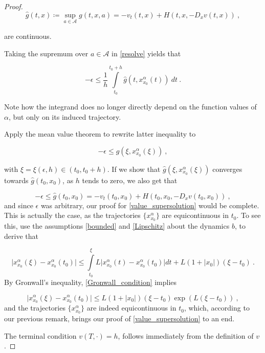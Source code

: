 \begin{theorem}
\begin{proof}
		\begin{equation*}
			\hat{g}(t, x) \coloneqq \sup\limits_{a \in \mathcal{A}} g(t, x, a) = -v_t(t, x) + H(t, x, -D_x v(t, x)) \ ,
		\end{equation*}
		
		are continuous.
		
		Taking the supremum over $ a \in \mathcal{A} $ in \eqref{resolve} yields that
		
		\begin{equation*}
			- \epsilon \leq \frac{1}{h} \int\limits^{t_0 + h}_{t_0} \hat{g}(t, x^{\alpha}_{x_0}(t)) \ dt \ .
		\end{equation*}
		
		Note how the integrand does no longer directly depend on the function values of $ \alpha $, but only on its induced trajectory.
		
		Apply the mean value theorem to rewrite latter inequality to
		
		\begin{equation*}
			- \epsilon \leq \hat{g}(\xi, x^{\alpha}_{x_0}(\xi)) \ ,
		\end{equation*}
		
		with $ \xi = \xi(\epsilon, h) \in \left( t_0, t_0 + h \right) $. If we show that $ \hat{g}(\xi, x^{\alpha}_{x_0}(\xi)) $ converges towards $ \hat{g}(t_0, x_0) $, as $ h $ tends to zero, we also get that
		
		\begin{equation*}
			-\epsilon \leq \hat{g}(t_0, x_0) = -v_t(t_0, x_0) + H(t_0, x_0, -D_x v(t_0, x_0)) \ ,
		\end{equation*}
		and since $ \epsilon $ was arbitrary, our proof for \eqref{value_supersolution} would be complete. This is actually the case, as the trajectories $ \{ x^{\alpha}_{x_0} \} $ are equicontinuous in $ t_0 $. To see this, use the assumptions \eqref{bounded} and \eqref{Lipschitz} about the dynamics $ b $, to derive that
		
		\begin{equation}
			\label{Gronwall_condition}
			\lvert x^{\alpha}_{x_0} (\xi) - x^{\alpha}_{x_0} (t_0) \rvert \leq \int\limits^{\xi}_{t_0} L \lvert x^{\alpha}_{x_0} (t) - x^{\alpha}_{x_0} (t_0) \rvert dt + L(1 + \lvert x_0 \rvert)(\xi - t_0) \ .
		\end{equation}
		By Gronwall's inequality, \eqref{Gronwall_condition} implies
		
		\begin{equation}
		\label{trajectory equicontinuous}
				\lvert x^{\alpha}_{x_0} (\xi) - x^{\alpha}_{x_0} (t_0) \rvert \leq L(1 + \lvert x_0 \rvert)(\xi - t_0) \exp(L(\xi - t_0)) \ ,
		\end{equation}
		and the trajectories $ \{ x^{\alpha}_{x_0} \} $ are indeed equicontinuous in $ t_0 $, which, according to our previous remark, brings our proof of \eqref{value_supersolution} to an end.
		
		The terminal condition $ v(T, \cdot) = h $, follows immediately from the definition of $ v $.
	\end{proof}
\end{theorem}